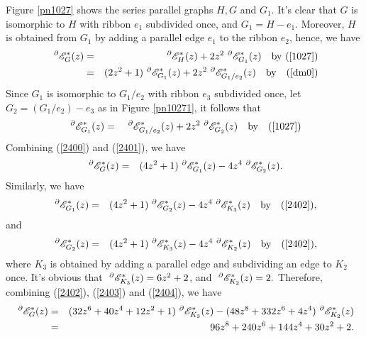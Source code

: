 \begin{example}
  Figure \ref{pn1027} shows the  series parallel graphs $H, G$ and $G_1.$ %
It's clear that $G$ is isomorphic to $H$ with ribbon $e_1$ subdivided once, and  $G_{1}=H-e_{1}$. %
Moreover, $H$ is obtained from $G_1$ by adding a parallel edge $e_{1}$ to the ribbon $e_2$, hence, we have
\begin{eqnarray}\label{2400}
~^{\partial}{{\mathscr{E}}}^{*}_{G}(z)&=&~^{\partial}{{\mathscr{E}}}^{*}_{H}(z)+2z^{2}~^{\partial}{{\mathscr{E}}}^{*}_{G_{1}}(z)
\quad\text{by~(\ref{1027})} \notag\\
&=&(2z^{2}+1)~^{\partial}{{\mathscr{E}}}^{*}_{G_{1}}(z)+2z^{2}~^{\partial}{{\mathscr{E}}}^{*}_{G_{1}/e_{2}}(z)\quad\text{by ~ (\ref{dm0})}
\end{eqnarray}
Since $G_1$ is isomorphic to $G_{1}/e_{2}$ with ribbon $e_3$ subdivided once, let $G_{2}=(G_{1}/e_{2})-e_{3}$ as in Figure \ref{pn10271}, it follows that
\begin{eqnarray}\label{2401}
~^{\partial}{{\mathscr{E}}}^{*}_{G_{1}}(z)
&=&~^{\partial}{{\mathscr{E}}}^{*}_{G_{1}/e_{2}}(z)+2z^{2}~^{\partial}{{\mathscr{E}}}^{*}_{G_{2}}(z)\quad\text{by ~ (\ref{1027})}
\end{eqnarray}
Combining (\ref{2400}) and (\ref{2401}), we have
\begin{eqnarray}\label{2402}
~^{\partial}{{\mathscr{E}}}^{*}_{G}(z)&=& (4z^{2}+1)~^{\partial}{{\mathscr{E}}}^{*}_{G_{1}}(z)-4z^{4}~^{\partial}{{\mathscr{E}}}^{*}_{G_{2}}(z).
\end{eqnarray}
Similarly, we have
\begin{eqnarray}\label{2403}
~^{\partial}{{\mathscr{E}}}^{*}_{G_{1}}(z)&=& (4z^{2}+1)~^{\partial}{{\mathscr{E}}}^{*}_{G_{2}}(z)-4z^{4}~^{\partial}{{\mathscr{E}}}^{*}_{K_{3}}(z)\quad\text{by ~ (\ref{2402})},
\end{eqnarray}
and
\begin{eqnarray}\label{2404}
~^{\partial}{{\mathscr{E}}}^{*}_{G_{2}}(z)&=& (4z^{2}+1)~^{\partial}{{\mathscr{E}}}^{*}_{K_{3}}(z)-4z^{4}~^{\partial}{{\mathscr{E}}}^{*}_{K_{2}}(z)\quad\text{by ~ (\ref{2402})},
\end{eqnarray}
where  $K_{3}$ is obtained by adding a parallel edge  and subdividing an edge to $K_{2}$ once. It's obvious that $~^{\partial}{{\mathscr{E}}}^{*}_{K_{3}}(z)=6z^{2}+2$, and $~^{\partial}{{\mathscr{E}}}^{*}_{K_{2}}(z)=2.$
Therefore,
combining (\ref{2402}), (\ref{2403}) and (\ref{2404}),  we have
\begin{eqnarray*}\label{2405}
~^{\partial}{{\mathscr{E}}}^{*}_{G}(z)&=& (32z^{6}+40z^{4}+12z^{2}+1)~^{\partial}{{\mathscr{E}}}^{*}_{K_{3}}(z)-(48z^{8}+332z^{6}+4z^{4})~^{\partial}{{\mathscr{E}}}^{*}_{K_{2}}(z)
\notag\\
&=& 96z^{8}+240z^{6}+144z^{4}+30z^{2}+2.
\end{eqnarray*}


\end{example}





